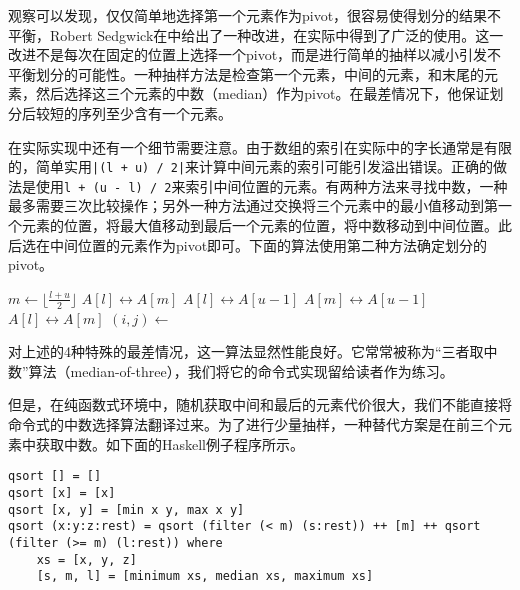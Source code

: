 \documentclass[UTF8]{article}
\begin{document}
观察可以发现，仅仅简单地选择第一个元素作为pivot，很容易使得划分的结果不平衡，Robert Sedgwick在\cite{qsort-impl}中给出了一种改进，在实际中得到了广泛的使用。这一改进不是每次在固定的位置上选择一个pivot，而是进行简单的抽样以减小引发不平衡划分的可能性。一种抽样方法是检查第一个元素，中间的元素，和末尾的元素，然后选择这三个元素的中数（median）作为pivot。在最差情况下，他保证划分后较短的序列至少含有一个元素。

在实际实现中还有一个细节需要注意。由于数组的索引在实际中的字长通常是有限的，简单实用\texttt{|(l + u) / 2|}来计算中间元素的索引可能引发溢出错误。正确的做法是使用\texttt{l + (u - l) / 2}来索引中间位置的元素。有两种方法来寻找中数，一种最多需要三次比较操作\cite{3-way-part}；另外一种方法通过交换将三个元素中的最小值移动到第一个元素的位置，将最大值移动到最后一个元素的位置，将中数移动到中间位置。此后选在中间位置的元素作为pivot即可。下面的算法使用第二种方法确定划分的pivot。

\begin{algorithmic}[1]
    \State $m \gets \lfloor \frac{l + u}{2} \rfloor$ 
     
      \State {} $A[l] \leftrightarrow A[m]$
    \EndIf
     
      \State {} $A[l] \leftrightarrow A[u-1]$
    \EndIf
     
      \State {} $A[m] \leftrightarrow A[u-1]$
    \EndIf
    \State {} $A[l] \leftrightarrow A[m]$
    \State $(i, j) \gets $ 
    \State {}
    \State {}
  \EndIf
\EndProcedure
\end{algorithmic}

对上述的4种特殊的最差情况，这一算法显然性能良好。它常常被称为“三者取中数”算法（median-of-three），我们将它的命令式实现留给读者作为练习。

但是，在纯函数式环境中，随机获取中间和最后的元素代价很大，我们不能直接将命令式的中数选择算法翻译过来。为了进行少量抽样，一种替代方案是在前三个元素中获取中数。如下面的Haskell例子程序所示。

\lstset{language=Haskell}
\begin{lstlisting}
qsort [] = []
qsort [x] = [x]
qsort [x, y] = [min x y, max x y]
qsort (x:y:z:rest) = qsort (filter (< m) (s:rest)) ++ [m] ++ qsort (filter (>= m) (l:rest)) where
    xs = [x, y, z]
    [s, m, l] = [minimum xs, median xs, maximum xs]
\end{lstlisting}
\end{document}
